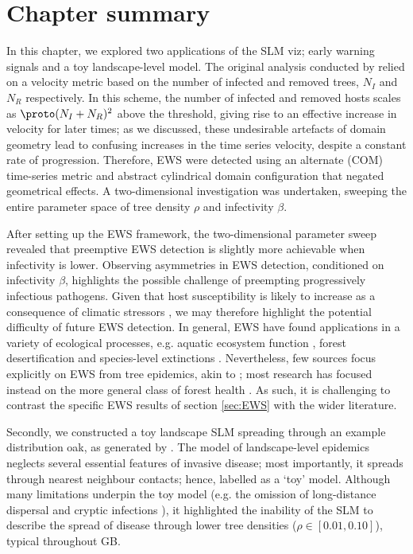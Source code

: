 \newpage

\section{Chapter summary}


In this chapter, we explored two applications of the SLM viz; early warning signals and a toy landscape-level model.
The original analysis conducted by \cite{OROZCOFUENTES201912} relied on a velocity metric based on the number of 
infected and removed trees, $N_I$ and $N_R$ respectively. In this scheme, the number of infected and removed hosts scales as
$\proto (N_I + N_R)^2$ above the threshold, giving rise to an effective increase in velocity for later times;
as we discussed, these undesirable artefacts of domain geometry lead to confusing increases in the time series velocity, 
despite a constant rate of progression. Therefore, EWS were detected using an alternate (COM) time-series metric and abstract 
cylindrical domain configuration that negated geometrical effects.
A two-dimensional investigation was undertaken, sweeping the entire parameter space of tree density $\rho$ and infectivity $\beta$.

After setting up the EWS framework, the two-dimensional parameter sweep revealed that preemptive EWS detection is 
slightly more achievable when infectivity is lower. Observing asymmetries in EWS detection, conditioned on infectivity
$\beta$, highlights the possible challenge of preempting progressively infectious pathogens.
Given that host susceptibility is likely to increase as a consequence of climatic stressors \cite{garrett2006climate},
we may therefore highlight the potential difficulty of future EWS detection.
In general, EWS have found applications in a variety of ecological processes, e.g. aquatic ecosystem function \cite{kramer1991aquatic}, 
forest desertification \cite{yang2005desertification} and species-level extinctions \cite{drake2010early}.
Nevertheless, few sources focus explicitly on EWS from tree epidemics, akin to \cite{OROZCOFUENTES201912};
most research has focused instead on the more general class of forest health \cite{torres2021role}. 
As such, it is challenging to contrast the specific EWS results of section \ref{sec:EWS} 
with the wider literature.

Secondly, we constructed a toy landscape SLM spreading through an example distribution oak, as generated by \cite{hill.data}.
The model of landscape-level epidemics neglects several essential features of invasive disease; most importantly, 
it spreads through nearest neighbour contacts; hence, labelled as a `toy' model.
Although many limitations underpin the toy model (e.g. the omission of long-distance dispersal \cite{long-range-dispersal}
and cryptic infections \cite{gilligan2007impact}), it highlighted the inability of the SLM to describe the spread of disease
through lower tree densities ($\rho \in [0.01, 0.10]$), typical throughout GB.

